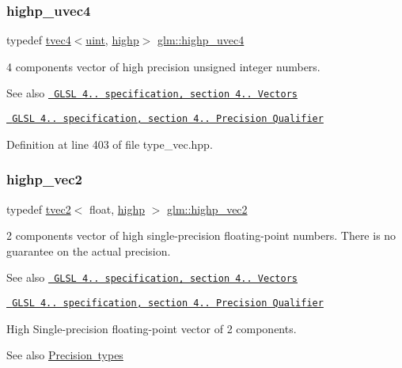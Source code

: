 \subsubsection{\texorpdfstring{highp\_uvec4}{highp\_uvec4}}
{\footnotesize\ttfamily typedef \mbox{\hyperlink{structglm_1_1tvec4}{tvec4}}$<$\mbox{\hyperlink{group__core__precision_ga4fd29415871152bfb5abd588334147c8}{uint}}, \mbox{\hyperlink{namespaceglm_a0f04f086094c747d227af4425893f545ac6f7eab42eacbb10d59a58e95e362074}{highp}}$>$ \mbox{\hyperlink{group__core__precision_gaced82ea2e726f079d4d72cf180a75b8b}{glm\+::highp\+\_\+uvec4}}}

4 components vector of high precision unsigned integer numbers.

\begin{DoxySeeAlso}{See also}
\href{http://www.opengl.org/registry/doc/GLSLangSpec.4.20.8.pdf}{\texttt{ G\+L\+SL 4.. specification, section 4.. Vectors}} 

\href{http://www.opengl.org/registry/doc/GLSLangSpec.4.20.8.pdf}{\texttt{ G\+L\+SL 4.. specification, section 4.. Precision Qualifier}} 
\end{DoxySeeAlso}


Definition at line 403 of file type\+\_\+vec.\+hpp.

\mbox{\label{group__core__precision_ga84532f0e0c7e2af99edd65dc182aba51}} 
\subsubsection{\texorpdfstring{highp\_vec2}{highp\_vec2}}
{\footnotesize\ttfamily typedef \mbox{\hyperlink{structglm_1_1tvec2}{tvec2}}$<$ float, \mbox{\hyperlink{namespaceglm_a0f04f086094c747d227af4425893f545ac6f7eab42eacbb10d59a58e95e362074}{highp}} $>$ \mbox{\hyperlink{group__core__precision_ga84532f0e0c7e2af99edd65dc182aba51}{glm\+::highp\+\_\+vec2}}}

2 components vector of high single-\/precision floating-\/point numbers. There is no guarantee on the actual precision.

\begin{DoxySeeAlso}{See also}
\href{http://www.opengl.org/registry/doc/GLSLangSpec.4.20.8.pdf}{\texttt{ G\+L\+SL 4.. specification, section 4.. Vectors}} 

\href{http://www.opengl.org/registry/doc/GLSLangSpec.4.20.8.pdf}{\texttt{ G\+L\+SL 4.. specification, section 4.. Precision Qualifier}}
\end{DoxySeeAlso}
High Single-\/precision floating-\/point vector of 2 components. \begin{DoxySeeAlso}{See also}
\mbox{\hyperlink{group__core__precision}{Precision types}} 
\end{DoxySeeAlso}



